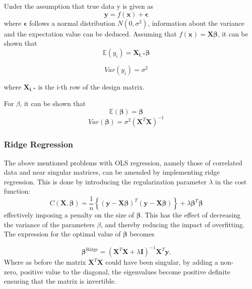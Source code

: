 \documentclass[11pt,a4paper,titlepage]{article}
\begin{document}
Under the assumption that true data y is given as
\begin{equation*}
\bm{y}=f(\bm{x})+\bm{\epsilon}
\end{equation*}
where $\bm{\epsilon}$ follows a normal distribution $N(0,\sigma^2)$, information about the variance and the expectation value can be deduced. Assuming that $f(\bm{x})=\bm{X\beta}$, it can be shown that
\begin{equation*}
\mathbb{E}(y_i)=\bm{X_{i,*}\beta}
\end{equation*}

\begin{equation*}
Var(y_i)=\sigma^2
\end{equation*}

where $\bm{X_{i,*}}$ is the i-th row of the design matrix.

For $\beta$, it can be shown that
\begin{equation*}
\mathbb{E}(\bm{\beta})=\bm{\beta}
\end{equation*}
\begin{equation*}
Var(\bm{\beta})=\sigma^2(\bm{X}^T\bm{X})^{-1}
\end{equation*}
\subsubsection{Ridge Regression}
The above mentioned problems with OLS regression, namely those of correlated data and near singular matrices, can be amended by implementing ridge regression. This is done by introducing the regularization parameter $ \lambda$ in the cost function:
\begin{equation*}
    C(\boldsymbol{X},\boldsymbol{\beta})=\frac{1}{n}\left\{(\boldsymbol{y}-\boldsymbol{X}\boldsymbol{\beta})^T(\boldsymbol{y}-\boldsymbol{X}\boldsymbol{\beta})\right\}+\lambda\boldsymbol{\beta}^T\boldsymbol{\beta}
\end{equation*}
effectively imposing a penalty on the size of $\boldsymbol{\beta}$. This has the effect of decreasing the variance of the parameters $\beta$, and thereby reducing the impact of overfitting.\\The expression for the optimal value of $\boldsymbol{\beta}$ becomes

\begin{equation*}
    \boldsymbol{\beta}^{\mathrm{Ridge}} = \left(\boldsymbol{X}^T\boldsymbol{X}+\lambda\boldsymbol{I}\right)^{-1}\boldsymbol{X}^T\boldsymbol{y}.
\end{equation*}
Where as before the matrix $\boldsymbol{X}^T\boldsymbol{X}$ could have been singular, by adding a non- zero, positive value to the diagonal, the eigenvalues become positive definite ensuring that the matrix is invertible.
\end{document}

